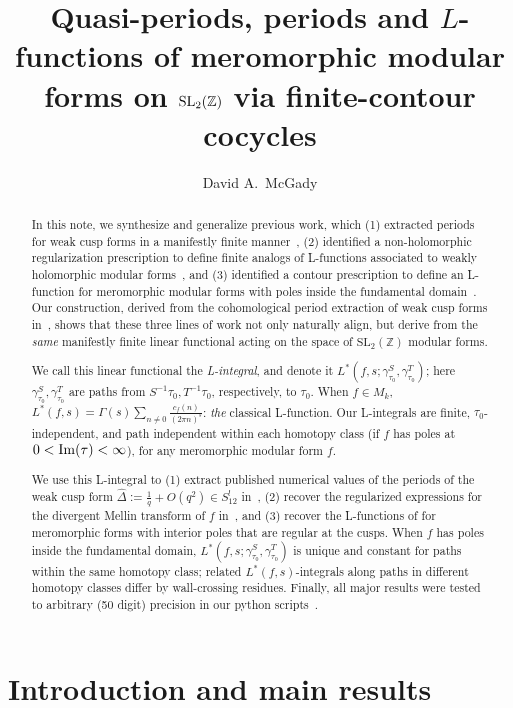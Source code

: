 \documentclass[11pt]{article}
\title{Quasi-periods, periods and $L$-functions of meromorphic modular forms on $\SLZ$ via finite-contour cocycles}
\author{David A.\ McGady}
\date{}
\numberwithin{equation}{section}  %
\newcommand{\ZZ}{\mathbb{Z}}
\newcommand{\SLZ}{\mathrm{SL}_2(\ZZ)}
\newcommand{\Dhat}{\widehat{\Delta}}
\begin{document}
\maketitle

\begin{abstract}
In this note, we synthesize and generalize previous work, which 
(1) extracted periods for weak cusp forms in a manifestly finite 
manner~\cite{Brown2017}, (2) identified a non-holomorphic regularization 
prescription to define finite analogs of L-functions associated to weakly 
holomorphic modular forms~\cite{BFK2011}, and (3) identified a contour 
prescription to define an L-function for meromorphic modular forms with poles inside 
the fundamental domain~\cite{1806}. Our construction, derived from the 
cohomological period extraction of weak cusp forms in~\cite{Brown2017}, 
shows that these three lines of work not only naturally align, but derive from 
the \emph{same} manifestly finite linear functional acting on the space of $\SLZ$ 
modular forms. 

We call this linear functional the \emph{L-integral}, and denote it 
$L^*(f, s; \gamma^S_{\tau_0}, \gamma^T_{\tau_0})$; here 
$\gamma^S_{\tau_0}, \gamma^T_{\tau_0}$ are paths from 
$S^{-1}\tau_0, T^{-1}\tau_0$, respectively, to $\tau_0$. When $f \in M_k$, 
$L^*(f,s) = \Gamma(s) \sum_{n\neq0} \tfrac{c_f(n)}{(2\pi n)^s}$: \emph{the} 
classical L-function. Our L-integrals are finite, $\tau_0$-independent, and path 
independent within each homotopy class (if $f$ has poles at $0 < {\rm Im}(\tau) 
< \infty$), for any meromorphic modular form $f$.

We use this L-integral to (1) extract published numerical values of the 
periods of the weak cusp form $\Dhat := \tfrac{1}{q} + O(q^2) \in S_{12}^!$ 
in~\cite{Brown2017}, (2) recover the regularized expressions for the 
divergent Mellin transform of $f$ in~\cite{BFK2011}, and (3) recover the 
L-functions of \cite{1806} for meromorphic forms with interior poles that are 
regular at the cusps. When $f$ has poles inside the fundamental domain, 
$L^*(f, s; \gamma^S_{\tau_0}, \gamma^T_{\tau_0})$ is unique and constant for 
paths within the same homotopy class; related $L^*(f,s)$-integrals along paths 
in different homotopy classes differ by wall-crossing residues. Finally, all major 
results were tested to arbitrary (50 digit) precision in our python scripts~\cite{VerifyScripts}.
\end{abstract}

 
\section{Introduction and main results}\label{sec:intro}\label{sec:intro-results}
 
\end{document}
